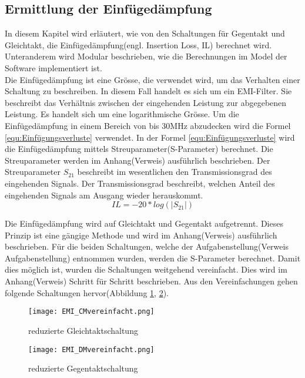 \subsection{Ermittlung der Einfügedämpfung} \label{subsec:ermittlung}
In diesem Kapitel wird erläutert, wie von den Schaltungen für Gegentakt und Gleichtakt, die Einfügedämpfung(engl. Insertion Loss, IL) berechnet wird. Unteranderem wird Modular beschrieben, wie die Berechnungen im Model der Software implementiert ist. \\

Die Einfügedämpfung ist eine Grösse, die verwendet wird, um das Verhalten einer Schaltung zu beschreiben. In diesem Fall handelt es sich um ein EMI-Filter. Sie beschreibt das Verhältnis zwischen der eingehenden Leistung zur abgegebenen Leistung. Es handelt sich um eine logarithmische Grösse. Um die Einfügedämpfung in einem Bereich von bis 30MHz abzudecken wird die Formel \ref{equ:Einfügungsverluste} verwendet. In der Formel \ref{equ:Einfügungsverluste} wird die Einfügedämpfung mittels Streuparameter(S-Parameter) berechnet. Die Streuparameter werden im Anhang(Verweis) ausführlich beschrieben. Der Streuparameter $S_{21}$ beschreibt im wesentlichen den Transmissionsgrad des eingehenden Signals. Der Transmissionsgrad beschreibt, welchen Anteil des eingehenden Signals am Ausgang wieder herauskommt. \\

\begin{equation}\label{equ:Einfügungsverluste}
	IL = -20*log (\left\lvert S_{21} \right\rvert)
\end{equation}

Die Einfügedämpfung wird auf Gleichtakt und Gegentakt aufgetrennt. Dieses Prinzip ist eine gängige Methode und wird im Anhang(Verweis) ausführlich beschrieben. Für die beiden Schaltungen, welche der Aufgabenstellung(Verweis Aufgabenstellung) entnommen wurden, werden die S-Parameter berechnet. Damit dies möglich ist, wurden die Schaltungen weitgehend vereinfacht. Dies wird im Anhang(Verweis) Schritt für Schritt beschrieben. Aus den Vereinfachungen gehen folgende Schaltungen hervor(Abbildung \ref{fig:cmschaltung}, \ref{fig:dmschaltung}).

\begin{figure}[H]
		\centering
		\texttt{[image: EMI\_CMvereinfacht.png]}
		\label{fig:cmschaltung}
		\caption{reduzierte Gleichtaktschaltung}
\end{figure}

\begin{figure}[H]
		\centering
		\texttt{[image: EMI\_DMvereinfacht.png]}
		\label{fig:dmschaltung}
		\caption{reduzierte Gegentaktschaltung}
\end{figure}

